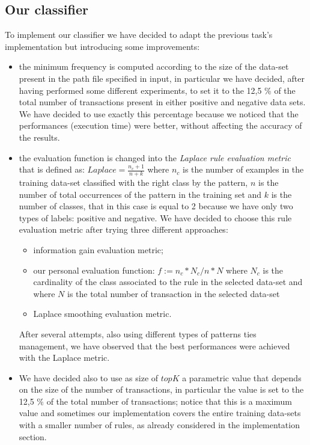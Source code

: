 \documentclass[11pt, a4paper]{article}
\begin{document}
		\subsection{Our classifier}
			To implement our classifier we have decided to adapt the previous task's implementation but introducing some improvements:
			\begin{itemize}
				\item the minimum frequency is computed according to the size of the data-set present in the path file specified in input, in particular we have decided, after having performed some different experiments, to set it to the 12,5 \% of the total number of transactions present in either positive and negative data sets. We have decided to use exactly this percentage because we noticed that the performances (execution time) were better, without affecting the accuracy of the results.
				\item the evaluation function is changed into the \textit{Laplace rule evaluation metric} that is defined as: $Laplace = \frac{n_c +1}{n + k}$ where $n_c$ is the number of examples in the training data-set classified with the right class by the pattern, $n$ is the number of total occurrences of the pattern in the training set and $k$ is the number of classes, that in this case is equal to 2 because we have only two types of labels: positive and negative.
				We have decided to choose this rule evaluation metric after trying three different approaches:
				\begin{itemize}
					\item information gain evaluation metric;
					\item our personal evaluation function: $f := n_c * N_c / n * N$ where $N_c$ is the cardinality of the class associated to the rule  in the selected data-set and where $N$ is the total number of transaction in the selected data-set 
					\item Laplace smoothing evaluation metric.
				\end{itemize}
				After several attempts, also using different types of patterns ties management, we have observed that the best performances were achieved with the Laplace metric. 
				\item We have decided also to use as size of $topK$ a parametric value that depends on the size of the number of transactions, in particular the value is set to the 12,5 \% of the total number of transactions; notice that this is a maximum value and sometimes our implementation covers the entire training data-sets with a smaller number of rules, as already considered in the implementation section.	
			\end{itemize}
			
\end{document}

